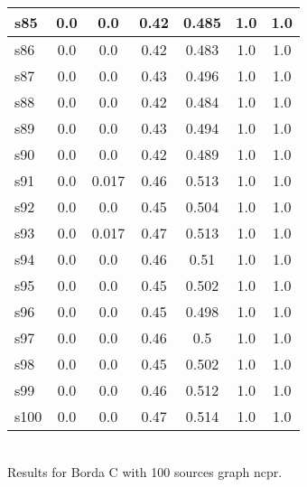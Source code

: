 \documentclass{article}
\begin{document}
\begin{tabular}{|l|c|c|c|c|c|c|}
\hline
s85 &0.0 & 0.0 & 0.42 & 0.485 & 1.0 & 1.0\\
\hline
s86 &0.0 & 0.0 & 0.42 & 0.483 & 1.0 & 1.0\\
\hline
s87 &0.0 & 0.0 & 0.43 & 0.496 & 1.0 & 1.0\\
\hline
s88 &0.0 & 0.0 & 0.42 & 0.484 & 1.0 & 1.0\\
\hline
s89 &0.0 & 0.0 & 0.43 & 0.494 & 1.0 & 1.0\\
\hline
s90 &0.0 & 0.0 & 0.42 & 0.489 & 1.0 & 1.0\\
\hline
s91 &0.0 & 0.017 & 0.46 & 0.513 & 1.0 & 1.0\\
\hline
s92 &0.0 & 0.0 & 0.45 & 0.504 & 1.0 & 1.0\\
\hline
s93 &0.0 & 0.017 & 0.47 & 0.513 & 1.0 & 1.0\\
\hline
s94 &0.0 & 0.0 & 0.46 & 0.51 & 1.0 & 1.0\\
\hline
s95 &0.0 & 0.0 & 0.45 & 0.502 & 1.0 & 1.0\\
\hline
s96 &0.0 & 0.0 & 0.45 & 0.498 & 1.0 & 1.0\\
\hline
s97 &0.0 & 0.0 & 0.46 & 0.5 & 1.0 & 1.0\\
\hline
s98 &0.0 & 0.0 & 0.45 & 0.502 & 1.0 & 1.0\\
\hline
s99 &0.0 & 0.0 & 0.46 & 0.512 & 1.0 & 1.0\\
\hline
s100 &0.0 & 0.0 & 0.47 & 0.514 & 1.0 & 1.0\\
\hline
\end{tabular}\\

\noindent Results for Borda C with 100 sources graph ncpr.
\end{document}
